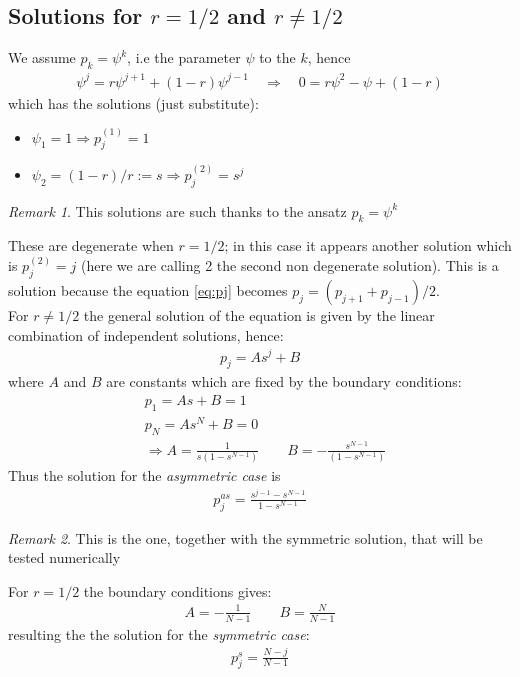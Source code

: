 \documentclass[4apaper,11pt,fleqn]{article}
\theoremstyle{remark}
\newtheorem*{rem}{Remark}
\theoremstyle{definition}
\begin{document}
\subsection{Solutions for $r=1/2$ and $r\neq 1/2$}
We assume $p_k = \psi^k$, i.e the parameter $\psi$ to the $k$, hence
\begin{align*}
  \psi^j = r\psi^{j+1} + (1-r) \psi^{j-1} \quad \Rightarrow \quad 0 = r\psi^2 - \psi + (1-r)
\end{align*}
which has the solutions (just substitute):
\begin{itemize}[leftmargin=*]
  \item $\psi_1 = 1 \Rightarrow p_j^{(1)} = 1$
  \item $\psi_2 = (1-r)/r := s \Rightarrow  p_j^{(2)} = s^j$
\end{itemize}
\begin{rem}
  This solutions are such thanks to the ansatz $p_k = \psi^k$
\end{rem}
These are degenerate when $r=1/2$; in this case it appears another solution which is $p_j^{(2)} = j$ (here we are calling 2 the second non degenerate solution). This is a solution because the equation \eqref{eq:pj} becomes $p_j = (p_{j+1}+p_{j-1})/2$.\\
For $r\neq1/2$ the general solution of the equation is given by the linear combination of independent solutions, hence:
\begin{align*}
  p_j = As^j + B
\end{align*}
where $A$ and $B$ are constants which are fixed by the boundary conditions:
\begin{align*}
   &p_1 = As + B = 1\\
   &p_N = As^N + B = 0\\
   &\Rightarrow A= \frac{1}{s(1-s^{N-1})} \qquad B = - \frac{s^{N-1}}{(1-s^{N-1})}
\end{align*}
Thus the solution for the \emph{asymmetric case} is
\begin{align}
  p_j^{as} = \frac{s^{j-1}-s^{N-1}}{1-s^{N-1}}
\end{align}
\begin{rem}
  This is the one, together with the symmetric solution, that will be tested numerically
\end{rem}

For $r=1/2$ the boundary conditions gives:
\begin{align*}
  A = -\frac{1}{N-1} \qquad B = \frac{N}{N-1}
\end{align*}
resulting the the solution for the \emph{symmetric case}:
\begin{align}
  \label{eq:solS}
  p_j^{s} = \frac{N-j}{N-1}
\end{align}
\end{document}
